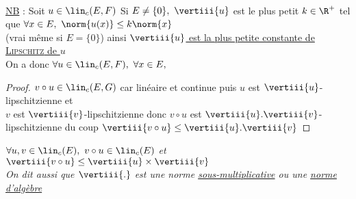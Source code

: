 		${}$ \\ 
		\\{\small \underline{NB} : Soit $u\in\lin_c (E,F)$ Si $E\neq\{0\} ,~\vertiii{u}$ est le plus petit $k\in\R^+$ tel que $\forall x\in E ,~
		\norm{u(x)} \leq k\norm{x}$ \\(vrai même si $E = \{ 0 \}$)  ainsi \underline{$\vertiii{u}$ est la plus petite constante de 
		\textsc{Lipschitz} de $u$} \\ On a donc $\forall u \in \lin_c (E,F) ,~\forall x\in E ,$ }
		\vspace*{0.5cm} \\ 
		\begin{proof}
		$v\circ u \in \lin_c (E,G)$ car linéaire et continue puis $u$ est $\vertiii{u}$-lipschitzienne et \\ $v$ est $\vertiii{v}$-lipschitzienne 
		donc $v\circ u$ est $\vertiii{u}.\vertiii{v}$-lipschitzienne du coup $\vertiii{v\circ u} \leq \vertiii{u} . \vertiii{v}$
		\end{proof}
		{\small \textit{$\forall u,v \in \lin_c (E) ,~v\circ u\in \lin_c(E)$ et $\vertiii{v\circ u} \leq \vertiii{u} \times \vertiii{v}$\\
		On dit aussi que $\vertiii{.}$ est une norme \underline{sous-multiplicative} ou une \underline{norme d'algèbre}}}
		\vspace*{0.5cm} \\ 
